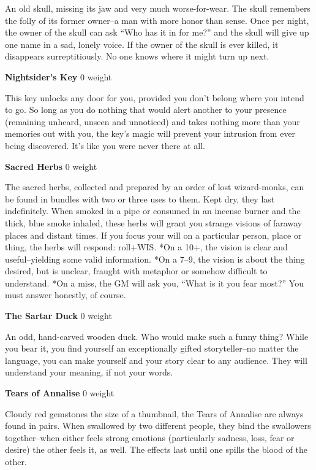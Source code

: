 An old skull, missing its jaw and very much worse-for-wear. The skull remembers the folly of its former owner--a man with more honor than sense. Once per night, the owner of the skull can ask ``Who has it in for me?'' and the skull will give up one name in a sad, lonely voice. If the owner of the skull is ever killed, it disappears surreptitiously. No one knows where it might turn up next.

{\noindent \bfseries Nightsider's Key} \hspace*{\fill} 0 weight

This key unlocks any door for you, provided you don't belong where you intend to go. So long as you do nothing that would alert another to your presence (remaining unheard, unseen and unnoticed) and takes nothing more than your memories out with you, the key's magic will prevent your intrusion from ever being discovered. It's like you were never there at all.

{\noindent \bfseries Sacred Herbs} \hspace*{\fill} 0 weight

The sacred herbs, collected and prepared by an order of lost wizard-monks, can be found in bundles with two or three uses to them. Kept dry, they last indefinitely. When smoked in a pipe or consumed in an incense burner and the thick, blue smoke inhaled, these herbs will grant you strange visions of faraway places and distant times. If you focus your will on a particular person, place or thing, the herbs will respond: roll+WIS. *On a 10+, the vision is clear and useful--yielding some valid information. *On a 7--9, the vision is about the thing desired, but is unclear, fraught with metaphor or somehow difficult to understand. *On a miss, the GM will ask you, ``What is it you fear most?'' You must answer honestly, of course.

{\noindent \bfseries The Sartar Duck} \hspace*{\fill} 0 weight

An odd, hand-carved wooden duck. Who would make such a funny thing? While you bear it, you find yourself an exceptionally gifted storyteller--no matter the language, you can make yourself and your story clear to any audience. They will understand your meaning, if not your words.

{\noindent \bfseries Tears of Annalise} \hspace*{\fill} 0 weight

Cloudy red gemstones the size of a thumbnail, the Tears of Annalise are always found in pairs. When swallowed by two different people, they bind the swallowers together--when either feels strong emotions (particularly sadness, loss, fear or desire) the other feels it, as well. The effects last until one spills the blood of the other.

